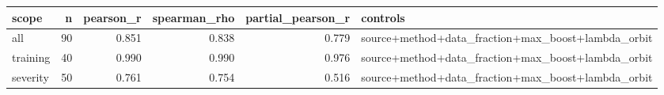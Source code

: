 \begin{tabular}{lrrrrl}
\toprule
scope & n & pearson_r & spearman_rho & partial_pearson_r & controls \\
\midrule
all & 90 & 0.851 & 0.838 & 0.779 & source+method+data_fraction+max_boost+lambda_orbit \\
training & 40 & 0.990 & 0.990 & 0.976 & source+method+data_fraction+max_boost+lambda_orbit \\
severity & 50 & 0.761 & 0.754 & 0.516 & source+method+data_fraction+max_boost+lambda_orbit \\
\bottomrule
\end{tabular}
